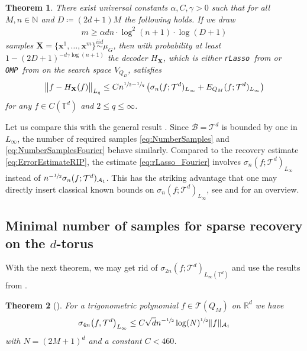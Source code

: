 \documentclass[11pt,reqno, a4paper]{article}
\numberwithin{equation}{section}
\newtheorem{theorem}{Theorem}[section]
\newcommand{\rlasso}{\texttt{rLasso}}
\newcommand{\omp}{\texttt{OMP}}
\begin{document}
\begin{theorem}\label{Thm:trigo}
There exist universal constants $\alpha, C, \gamma>0$ such that for all $M,n \in \mathbb{N}$ and $D \coloneqq (2d+1)M$ the following holds.
If we draw
\begin{gather}\label{eq:NumberSamplesFourier}
     m\geq \alpha d n \cdot \log^2(n+1) \cdot \log(D+1)
\end{gather}
samples $\mathbf{X}=\{\mathbf{x}^1,\ldots, \mathbf{x}^m\} \overset{iid}{\sim} \mu_G$, then with probability at least $1-(2D+1)^{-d\gamma \log (n+1)}$ the decoder $H_{\mathbf{X}}$, which is either \rlasso \ from  or \omp \ from  on the search space $V_{Q_D}$, satisfies
\begin{gather}\label{eq:rLasso_Fourier}
	\big\lVert f - H_{\mathbf{X}}(f)\big\rVert_{L_q} \leq  Cn^{\sfrac{1}{2}-\sfrac{1}{q}} \left(\sigma_n(f;\mathcal{T}^d)_{L_\infty} + E_{Q_M}(f;\mathcal{T}^d)_{L_\infty}\right)
\end{gather}
for any $f \in C(\mathbb{T}^d)$ and $2 \leq q \leq \infty$.
\end{theorem}
Let us compare this with the general result .
Since $\mathcal B = \mathcal{T}^d$ is bounded by one in $L_\infty$, the number of required samples \eqref{eq:NumberSamples} and \eqref{eq:NumberSamplesFourier} behave similarly.
Compared to the recovery estimate \eqref{eq:ErrorEstimateRIP}, the estimate \eqref{eq:rLasso_Fourier} involves $\sigma_n(f;\mathcal{T}^d)_{L_\infty}$ instead of $n^{-\sfrac{1}{2}}\sigma_n(f;\mathcal{T}^d)_{\mathcal{A}_1}$.
This has the striking advantage that one may directly insert classical known bounds on $\sigma_n(f;\mathcal{T}^d)_{L_\infty}$, see \cite{Belinskii1989, MSU25, TeUl22} and \cite[Sec.\ 7]{DTU18} for an overview.

\subsection[Minimal number of samples for sparse recovery on the \textit{d}-torus]{Minimal number of samples for sparse recovery on the $d$-torus}
With the next theorem, we may get rid of $\sigma_{2n}(f;\mathcal{T}^d)_{L_\infty(\mathbb{T}^d)}$ and use the results from .

\begin{theorem}[{\cite[Thm.\ 4.5]{MSU24_1}}]\label{thm:best_n_term_trig_pol}
    For a trigonometric polynomial $f\in\mathcal{T}(Q_M)$ on $\mathbb{R}^d$ we have
    \begin{gather}
        \sigma_{4n}\bigl(f,\mathcal{T}^d\bigr)_{L_\infty}\leq C \sqrt{d}n^{-\sfrac{1}{2}}\log(N)^{\sfrac{1}{2}}\lVert f\rVert_{\mathcal{A}_1}
    \end{gather}
    with $N=(2M+1)^d$ and a constant $C<460$.
\end{theorem}
\end{document}
